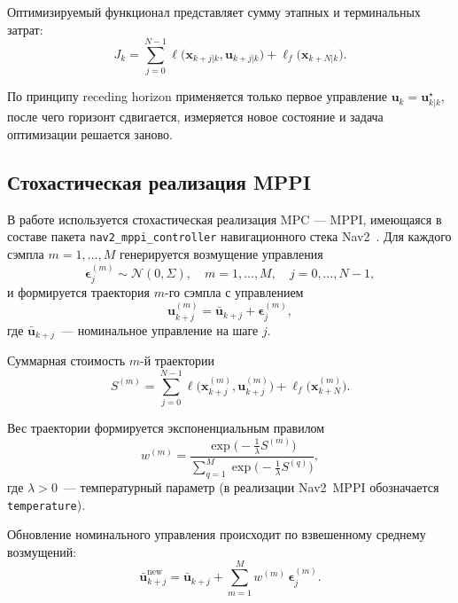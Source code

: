 Оптимизируемый функционал представляет сумму этапных и терминальных
затрат:
\begin{equation}
J_k = \sum_{j=0}^{N-1}
\ell\bigl(\mathbf{x}_{k+j|k}, \mathbf{u}_{k+j|k}\bigr)
+ \ell_f\bigl(\mathbf{x}_{k+N|k}\bigr).
\label{eq:mpc_cost}
\end{equation}

По принципу receding horizon применяется только первое управление
$\mathbf{u}_k = \mathbf{u}_{k|k}^{\star}$, после чего горизонт сдвигается,
измеряется новое состояние и задача оптимизации решается заново.

\subsection{Стохастическая реализация MPPI}

В работе используется стохастическая реализация MPC --- MPPI, имеющаяся
в составе пакета \texttt{nav2\_mppi\_controller} навигационного стека
Nav2~\cite{Alkhaddad2023MPC}. Для каждого сэмпла $m = 1,\dots,M$
генерируется возмущение управления
\begin{equation}
\boldsymbol{\epsilon}_{j}^{(m)} \sim \mathcal{N}(0,\Sigma),
\quad m = 1,\dots,M,\quad j = 0,\dots,N-1,
\label{eq:mppi_noise}
\end{equation}
и формируется траектория $m$-го сэмпла с управлением
\begin{equation}
\mathbf{u}_{k+j}^{(m)} = \bar{\mathbf{u}}_{k+j} + \boldsymbol{\epsilon}_{j}^{(m)},
\label{eq:mppi_u}
\end{equation}
где $\bar{\mathbf{u}}_{k+j}$~--- номинальное управление на шаге $j$.

Суммарная стоимость $m$-й траектории
\begin{equation}
S^{(m)} = \sum_{j=0}^{N-1}
\ell\bigl(\mathbf{x}_{k+j}^{(m)}, \mathbf{u}_{k+j}^{(m)}\bigr)
+ \ell_f\bigl(\mathbf{x}_{k+N}^{(m)}\bigr).
\label{eq:mppi_S}
\end{equation}

Вес траектории формируется экспоненциальным правилом
\begin{equation}
w^{(m)} =
\frac{\exp\bigl(-\tfrac{1}{\lambda} S^{(m)}\bigr)}
     {\sum\limits_{q=1}^{M} \exp\bigl(-\tfrac{1}{\lambda} S^{(q)}\bigr)},
\label{eq:mppi_weights}
\end{equation}
где $\lambda > 0$~--- температурный параметр (в реализации Nav2~MPPI
обозначается \texttt{temperature}).

Обновление номинального управления происходит по взвешенному среднему
возмущений:
\begin{equation}
\bar{\mathbf{u}}_{k+j}^{\text{new}} =
\bar{\mathbf{u}}_{k+j} + \sum_{m=1}^{M} w^{(m)}\,\boldsymbol{\epsilon}_{j}^{(m)}.
\label{eq:mppi_update}
\end{equation}

